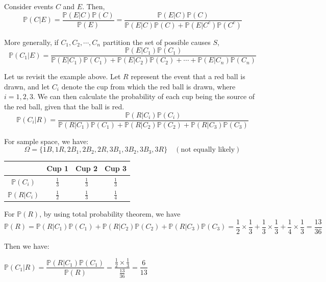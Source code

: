 \begin{theorem}
    Consider events \(C\) and \(E\). Then,
    \[
        \mathbb{P}(C \vert E) = \dfrac{\mathbb{P}(E \vert C)\mathbb{P}(C)}{\mathbb{P}(E)} = \dfrac{\mathbb{P}(E \vert C)\mathbb{P}(C)}{\mathbb{P}(E \vert C)\mathbb{P}(C) + \mathbb{P}(E \vert C^c)\mathbb{P}(C^c)}
    \]
\end{theorem}

More generally, if \(C_1, C_2, \cdots, C_n\) partition the set of possible causes \(S\), 
\[
    \mathbb{P}(C_1 \vert E) = \dfrac{\mathbb{P}(E \vert C_1)\mathbb{P}(C_1)}{\mathbb{P}(E \vert C_1)\mathbb{P}(C_1) + \mathbb{P}(E \vert C_2)\mathbb{P}(C_2) + \cdots +\mathbb{P}(E \vert C_n)\mathbb{P}(C_n)}
\]

Let us revisit the example above. Let \(R\) represent the event that a red ball is drawn, and let \(C_i\) denote the cup from which the red ball is drawn, where \(i = 1, 2, 3\). We can then calculate the probability of each cup being the source of the red ball, given that the ball is red.
\[
    \mathbb{P}(C_i \vert R) = \dfrac{\mathbb{P}(R \vert C_i)\mathbb{P}(C_i)}{\mathbb{P}(R \vert C_1)\mathbb{P}(C_1) + \mathbb{P}(R \vert C_2)\mathbb{P}(C_2) +\mathbb{P}(R \vert C_3)\mathbb{P}(C_3)}
\]

For sample space, we have: 
\[
    \Omega = \{1B, 1R, 2B_1, 2B_2, 2R, 3B_1, 3B_2, 3B_3, 3R\}\quad (\text{not equally likely})
\]
\begin{table}[H]
    \centering
    \begin{tabular}{c|c|c|c}
        \toprule
             & Cup 1 & Cup 2 & Cup 3   \\
        \midrule
            \(\mathbb{P}(C_i)\)  & \(\frac{1}{3}\)  & \(\frac{1}{3}\) & \(\frac{1}{3}\)  \\[5pt]
            \(\mathbb{P}(R \vert C_i)\)  & \(\frac{1}{2}\) & \(\frac{1}{3}\) & \(\frac{1}{4}\) \\
        \bottomrule
    \end{tabular}
\end{table}

For \(\mathbb{P}(R)\), by using total probability theorem, we have
\[
    \mathbb{P}(R) = \mathbb{P}(R \vert C_1)\mathbb{P}(C_1) + \mathbb{P}(R \vert C_2)\mathbb{P}(C_2) + \mathbb{P}(R \vert C_3)\mathbb{P}(C_3) = \dfrac{1}{2}\times\dfrac{1}{3} + \dfrac{1}{3}\times\dfrac{1}{3} + \dfrac{1}{4}\times\dfrac{1}{3} = \dfrac{13}{36}
\]

Then we have:

\(\mathbb{P}(C_1 \vert R) = \dfrac{\mathbb{P}(R \vert C_1)\mathbb{P}(C_1)}{\mathbb{P}(R)} = \dfrac{\frac{1}{2} \times \frac{1}{3}}{\frac{13}{36}} = \dfrac{6}{13}\)

